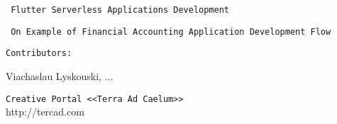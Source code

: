 
\thispagestyle{empty}
\noindent \texttt{ \large Flutter Serverless Applications Development }

\vspace{2mm}
\noindent \texttt{ \small On Example of Financial Accounting Application Development Flow }

\vspace{100mm}


\texttt{Contributors:}

Viachaslau Lyskouski, ...


\vspace{60mm}

\noindent \texttt{Creative Portal <<Terra Ad Caelum>>} \\
http://tercad.com\\